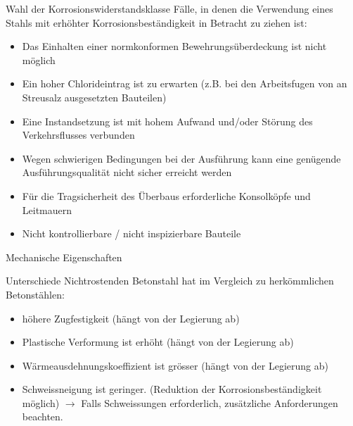 \begin{frame}{Wahl der Korrosionswiderstandsklasse}
    Fälle, in denen die Verwendung eines Stahls mit erhöhter Korrosionsbeständigkeit in Betracht zu ziehen ist:
    \begin{itemize}
        \item[\textbullet] Das Einhalten einer normkonformen Bewehrungsüberdeckung ist nicht möglich
        \item[\textbullet] Ein hoher Chlorideintrag ist zu erwarten (z.B. bei den Arbeitsfugen von an Streusalz ausgesetzten Bauteilen)
        \item[\textbullet] Eine Instandsetzung ist mit hohem Aufwand und/oder Störung des Verkehrsflusses verbunden
        \item[\textbullet] Wegen schwierigen Bedingungen bei der Ausführung kann eine genügende Ausführungsqualität nicht sicher erreicht werden
        \item[\textbullet] Für die Tragsicherheit des Überbaus erforderliche Konsolköpfe und Leitmauern
        \item[\textbullet] Nicht kontrollierbare / nicht inspizierbare Bauteile
    \end{itemize}
\end{frame}

\begin{frame}{Mechanische Eigenschaften}
    \begin{block}{Unterschiede}
        Nichtrostenden Betonstahl hat im Vergleich zu herkömmlichen Betonstählen:
        \begin{itemize}
            \item[\textbullet] höhere Zugfestigkeit (hängt von der Legierung ab)
            \item[\textbullet] Plastische Verformung ist erhöht (hängt von der Legierung ab)
            \item[\textbullet] Wärmeausdehnungskoeffizient ist grösser (hängt von der Legierung ab)
            \item[\textbullet] Schweissneigung ist geringer. (Reduktion der Korrosionsbeständigkeit möglich) $\rightarrow$ Falls Schweissungen erforderlich, zusätzliche Anforderungen beachten.
        \end{itemize}

    \end{block}

\end{frame}

